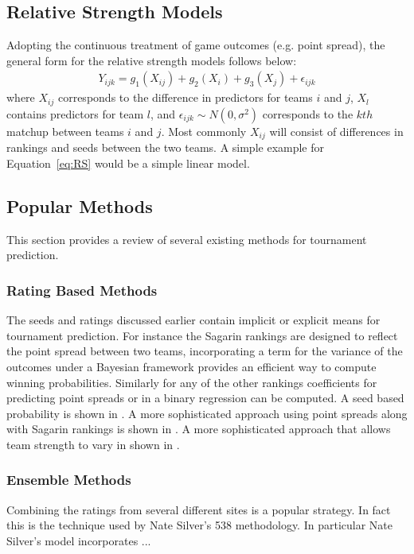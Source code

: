 \subsection{Relative Strength Models}
Adopting the continuous treatment of game outcomes (e.g. point spread), the general form for the relative strength models follows below:
\begin{eqnarray}
Y_{ijk} = g_1(X_{ij}) + g_2(X_i) + g_3(X_j) +  \epsilon_{ijk}
\label{eq:RS}
\end{eqnarray}
where $X_{ij}$ corresponds to the difference in predictors for teams $i$ and $j$, $X_l$ contains predictors for team $l$, and $\epsilon_{ijk} \sim N(0,\sigma^2)$ corresponds to the $kth$ matchup between teams $i$ and $j$.  Most commonly $X_{ij}$ will consist of differences in rankings and seeds between the two teams.  A simple example for Equation~\ref{eq:RS} would be a simple linear model.

\subsection{Popular Methods}  This section provides a review of several existing methods for tournament prediction.
\subsubsection{Rating Based Methods} 
The seeds and ratings discussed earlier contain implicit or explicit means for tournament prediction.  For instance the Sagarin rankings are designed to reflect the point spread between two teams, incorporating a term for the variance of the outcomes under a Bayesian framework provides an efficient way to compute winning probabilities.  Similarly for any of the other rankings coefficients for predicting point spreads or in a binary regression can be computed. A seed based probability is shown in \cite{schwertman1996}.  A more sophisticated approach using point spreads along with Sagarin rankings is shown in \cite{carlin1996}.  A more sophisticated approach that allows team strength to vary in shown in \cite{glickman1998}.
\subsubsection{Ensemble Methods}
Combining the ratings from several different sites is a popular strategy.  In fact this is the technique used by Nate Silver's 538 methodology.  In particular Nate Silver's model incorporates ... 

